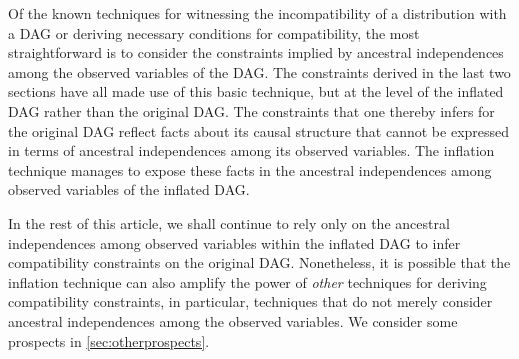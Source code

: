 Of the known techniques for witnessing the incompatibility of a distribution with a DAG or deriving necessary conditions for compatibility, the most straightforward is to consider the constraints implied by ancestral independences among the observed variables of the DAG. 
The constraints derived in the last two sections have all made use of this basic technique, but at the level of the inflated DAG rather than the original DAG.  The constraints that one thereby infers for the original DAG reflect facts about its causal structure that cannot be expressed in terms of ancestral independences among its observed variables.  The inflation technique manages to expose these facts in the ancestral independences among observed variables of the inflated DAG.


In the rest of this article, we shall continue to rely only on the ancestral independences among observed variables within the inflated DAG to infer compatibility constraints on the original DAG.   Nonetheless, it is possible that the inflation technique can also amplify the power of {\em other} techniques for deriving compatibility constraints, in particular, techniques that do not merely consider ancestral independences among the observed variables.  We consider some prospects in \cref{sec:otherprospects}.

